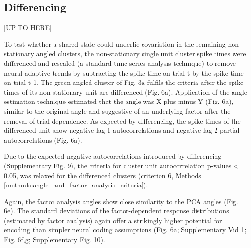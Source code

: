 \documentclass{article}
\begin{document}
\subsection*{Differencing}

[UP TO HERE]

To test whether a shared state could underlie covariation in the remaining non-stationary angled clusters, the non-stationary single unit cluster spike times were differenced and rescaled (a standard time-series analysis technique) to remove neural adaptive trends by subtracting the spike time on trial t by the spike time on trial t-1.
The green angled cluster of Fig. 3a fulfils the criteria after the spike times of its non-stationary unit are differenced (Fig. 6a). Application of the angle estimation technique estimated that the angle was X plus minus Y (Fig. 6a), similar to the original angle and suggestive of an underlying factor after the removal of trial dependence. As expected by differencing, the spike times of the differenced unit show negative lag-1 autocorrelations and negative lag-2 partial autocorrelations (Fig. 6a). 

 
Due to the expected negative autocorrelations introduced by differencing (Supplementary Fig. 9), the criteria for cluster unit autocorrelation p-values < 0.05, was relaxed for the differenced clusters (criterion 6, Methods \ref{methods:angle_and_factor_analysis_criteria}).

Again, the factor analysis angles show close similarity to the PCA angles (Fig. 6e).
The standard deviations of the factor-dependent response distributions (estimated by factor analysis) again offer a strikingly higher potential for encoding than simpler neural coding assumptions (Fig. 6a; Supplementary Vid 1; Fig. 6f,g; Supplementary Fig. 10).

\end{document}
